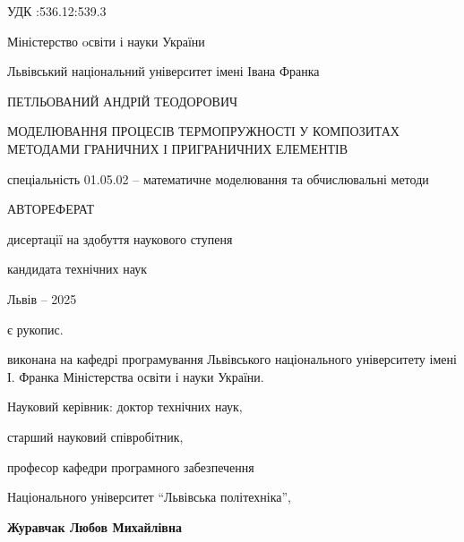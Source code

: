 \documentclass[a4paper,14pt]{extreport}
\begin{document}


\frontmatter 

\thispagestyle{empty}

УДК :536.12:539.3

 \begin{centering}
  \linespread{1.1}
  \vspace{2em}

{Міністерство oсвіти і науки України

Львівський національний університет імені Івана Франка}

  \vspace{5em}

ПЕТЛЬОВАНИЙ АНДРІЙ ТЕОДОРОВИЧ

  \vspace{2em}

МОДЕЛЮВАННЯ ПРОЦЕСІВ ТЕРМОПРУЖНОСТІ У КОМПОЗИТАХ МЕТОДАМИ ГРАНИЧНИХ І ПРИГРАНИЧНИХ ЕЛЕМЕНТІВ

  \vspace{5em}

спеціальність 01.05.02 -- математичне моделювання та обчислювальні методи

\vspace{5em}

АВТОРЕФЕРАТ 

дисертації на здобуття наукового ступеня 

кандидата технічних наук


\vspace{15em}

  Львів -- 2025
  
\end{centering}

\vspace{1em}


 є рукопис.

 виконана на кафедрі програмування Львівського національного університету імені І. Франка 
Міністерства освіти і науки України.

\vspace{2em}


Науковий керівник: доктор технічних наук,

\hspace{8em}старший науковий співробітник,

\hspace{8em}професор кафедри програмного забезпечення

\hspace{8em}Національного університет “Львівська політехніка”,

\hspace{8em}\textbf{Журавчак Любов Михайлівна} 

\vspace{35em}


\mainmatter %


\end{document}
